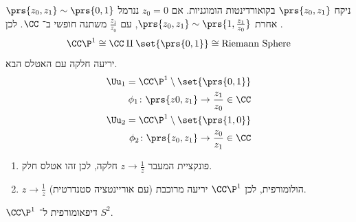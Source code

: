 \documentclass[a4paper,10pt,twoside,openany]{book}
\begin{document}
\begin{remark}
ניקח
$\prs{z_0, z_1}$
בקואורדינטות הומוגניות.
אם
$z_0 = 0$
ננרמל
$\prs{z_0, z_1} \sim \prs{0,1}$.
אחרת
$\prs{z_0, z_1} \sim \prs{1, \frac{z_1}{z_0}}$,
עם
$\frac{z_1}{z_0}$
משתנה חופשי ב־%
$\CC$.
לכן
\[\CC\P^1 \cong \CC \amalg \set{\prs{0,1}} \cong \text{Riemann Sphere}\]
יריעה חלקה עם האטלס הבא.
\begin{align*}
\Uu_1 = \CC\P^1 \setminus \set{\prs{0,1}} \\
\phi_1 \colon \prs{z0, z_1} \to \frac{z_1}{z_0} \in \CC \\
\Uu_2 = \CC\P^1 \setminus \set{\prs{1,0}} \\
\phi_2 \colon \prs{z_0, z_1} \to \frac{z_0}{z_1} \in \CC
\end{align*}

\begin{enumerate}
\item
פונקציית המעבר
$z \to \frac{1}{z}$
חלקה, לכן זהו אטלס חלק.

\item $z \to \frac{1}{z}$
הולומורפית, לכן
$\CC\P^1$
יריעה מרוכבת (עם אוריינטציה סטנדרטית).
\end{enumerate}
\end{remark}

\begin{exercise}
$\CC\P^1$
דיפאומורפית ל־%
$S^2$.
\end{exercise}
\end{document}
